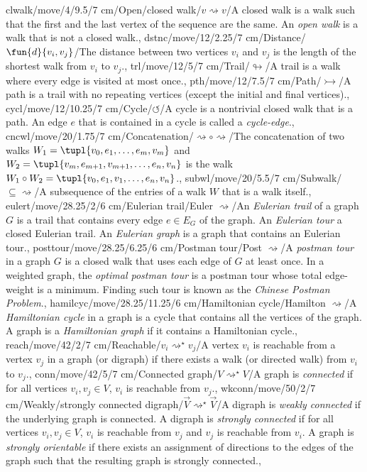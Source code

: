 clwalk/move/4/9.5/7 cm/{Open/closed walk}/{$v\rightsquigarrow v$}/{A closed walk is a walk such that the first and the last vertex of the sequence are the same. An \emph{open walk} is a walk that is not a closed walk.},
dstnc/move/12/2.25/7 cm/{Distance}/{$\fun{d}{v_i,v_j}$}/{The distance between two vertices $v_i$ and $v_j$ is the length of the shortest walk from $v_i$ to $v_j$.},
trl/move/12/5/7 cm/{Trail}/{$\looparrowright$}/{A trail is a walk where every edge is visited at most once.},%
pth/move/12/7.5/7 cm/{Path}/{$\rightarrowtail$}/{A path is a trail with no repeating vertices (except the initial and final vertices).},%
cycl/move/12/10.25/7 cm/{Cycle}/{$\circlearrowleft$}/{A cycle is a nontrivial closed walk that is a path. An edge $e$ that is contained in a cycle is called a \emph{cycle-edge}.},%
cncwl/move/20/1.75/7 cm/{Concatenation}/{$\rightsquigarrow\circ\rightsquigarrow$}/{The concatenation of two walks $W_1=\tupl{v_0,e_1,\ldots,e_m,v_m}$ and $W_2=\tupl{v_m,e_{m+1},v_{m+1},\ldots,e_n,v_n}$ is the walk $W_1\circ W_2=\tupl{v_0,e_1,v_1,\ldots,e_n,v_n}$.},
subwl/move/20/5.5/7 cm/{Subwalk}/{$\subseteq\rightsquigarrow$}/{A subsequence of the entries of a walk $W$ that is a walk itself.},
eulert/move/28.25/2/6 cm/{Eulerian trail}/{Euler $\rightsquigarrow$}/{An \emph{Eulerian trail} of a graph $G$ is a trail that contains every edge $e\in E_G$ of the graph. An \emph{Eulerian tour} a closed Eulerian trail. An \emph{Eulerian graph} is a graph that contains an Eulerian tour.},%
posttour/move/28.25/6.25/6 cm/{Postman tour}/{Post $\rightsquigarrow$}/{A \emph{postman tour} in a graph $G$ is a closed walk that uses each edge of $G$ at least once. In a weighted graph, the \emph{optimal postman tour} is a postman tour whose total edge-weight is a minimum. Finding such tour is known as the \emph{Chinese Postman Problem}.},%
hamilcyc/move/28.25/11.25/6 cm/{Hamiltonian cycle}/{Hamilton $\rightsquigarrow$}/{A \emph{Hamiltonian cycle} in a graph is a cycle that contains all the vertices of the graph. A graph is a \emph{Hamiltonian graph} if it contains a Hamiltonian cycle.},%
reach/move/42/2/7 cm/{Reachable}/{$v_i\rightsquigarrow^{\star} v_j$}/{A vertex $v_i$ is reachable from a vertex $v_j$ in a graph (or digraph) if there exists a walk (or directed walk) from $v_i$ to $v_j$.},
conn/move/42/5/7 cm/{Connected graph}/{$V\rightsquigarrow^{\star}V$}/{A graph is \emph{connected} if for all vertices $v_i,v_j\in V$, $v_i$ is reachable from $v_j$.},
wkconn/move/50/2/7 cm/{Weakly/strongly connected digraph}/{$\vec{V}\rightsquigarrow^{\star}\vec{V}$}/{A digraph is \emph{weakly connected} if the underlying graph is connected. A digraph is \emph{strongly connected} if for all vertices $v_i,v_j\in V$, $v_i$ is reachable from $v_j$ and $v_j$ is reachable from $v_i$. A graph is \emph{strongly orientable} if there exists an assignment of directions to the edges of the graph such that the resulting graph is strongly connected.},
